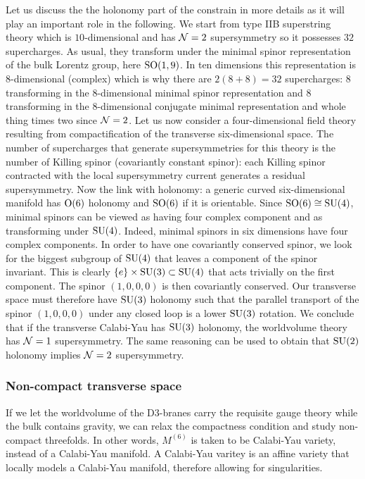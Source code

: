         Let us discuss the the holonomy part of the constrain in more details as it will play an important role in the following. We start from type IIB superstring theory which is $10$-dimensional and has $\mathcal{N}=2$ supersymmetry so it possesses $32$ supercharges. As usual, they transform under the minimal spinor representation of the bulk Lorentz group, here $\text{SO}(1,9)$. In ten dimensions this representation is $8$-dimensional (complex) which is why there are $2(8+8)=32$ supercharges: $8$ transforming in the $8$-dimensional minimal spinor representation and $8$ transforming in the $8$-dimensional conjugate minimal representation and whole thing times two since $\mathcal{N}=2$. Let us now consider a four-dimensional field theory resulting from compactification of the transverse six-dimensional space. The number of supercharges that generate supersymmetries for this theory is the number of Killing spinor (covariantly constant spinor): each Killing spinor contracted with the local supersymmetry current generates a residual supersymmetry\marker. Now the link with holonomy: a generic curved six-dimensional manifold has $\text{O}(6)$ holonomy and $\text{SO}(6)$ if it is orientable. Since $\text{SO}(6)\cong\text{SU}(4)$, minimal spinors can be viewed as having four complex component and as transforming under $\text{SU}(4)$. Indeed, minimal spinors in six dimensions have four complex components. In order to have one covariantly conserved spinor, we look for the biggest subgroup of $\text{SU}(4)$ that leaves a component of the spinor invariant. This is clearly $\{e\}\times\text{SU}(3)\subset\text{SU}(4)$ that acts trivially on the first component. The spinor $(1,0,0,0)$ is then covariantly conserved. Our transverse space must therefore have $\text{SU}(3)$ holonomy such that the parallel transport of the spinor $(1,0,0,0)$ under any closed loop is a lower $\text{SU}(3)$ rotation. We conclude that if the transverse Calabi-Yau has $\text{SU}(3)$ holonomy, the worldvolume theory has $\mathcal{N}=1$ supersymmetry. The same reasoning can be used to obtain that $\text{SU}(2)$ holonomy implies $\mathcal{N}=2$ supersymmetry.

    \subsubsection*{Non-compact transverse space}
    
        If we let the worldvolume of the D$3$-branes carry the requisite gauge theory while the bulk contains gravity, we can relax the compactness condition and study non-compact threefolds. In other words, $M^{(6)}$ is taken to be Calabi-Yau variety, instead of a Calabi-Yau manifold. A Calabi-Yau varitey is an affine variety that locally models a Calabi-Yau manifold, therefore allowing for singularities. 
        
